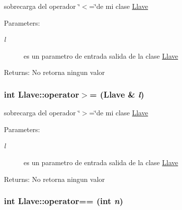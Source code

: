 sobrecarga del operador \char`\"{}$<$=\char`\"{}de mi clase \hyperlink{classLlave}{Llave} \begin{Desc}
\item[Parameters:]
\begin{description}
\item[{\em l}]es un parametro de entrada salida de la clase \hyperlink{classLlave}{Llave} \end{description}
\end{Desc}
\begin{Desc}
\item[Returns:]No retorna ningun valor \end{Desc}
\hypertarget{classLlave_ad93df44517e7d51ceef30182afb8232}{
\subsubsection[operator$>$=]{\setlength{\rightskip}{0pt plus 5cm}int Llave::operator$>$= ({\bf Llave} \& {\em l})}}
\label{classLlave_ad93df44517e7d51ceef30182afb8232}


sobrecarga del operador \char`\"{}$>$=\char`\"{}de mi clase \hyperlink{classLlave}{Llave} \begin{Desc}
\item[Parameters:]
\begin{description}
\item[{\em l}]es un parametro de entrada salida de la clase \hyperlink{classLlave}{Llave} \end{description}
\end{Desc}
\begin{Desc}
\item[Returns:]No retorna ningun valor \end{Desc}
\hypertarget{classLlave_635d5c55c24d90520c5460973058b1ef}{
\subsubsection[operator==]{\setlength{\rightskip}{0pt plus 5cm}int Llave::operator== (int {\em n})}}
\label{classLlave_635d5c55c24d90520c5460973058b1ef}


